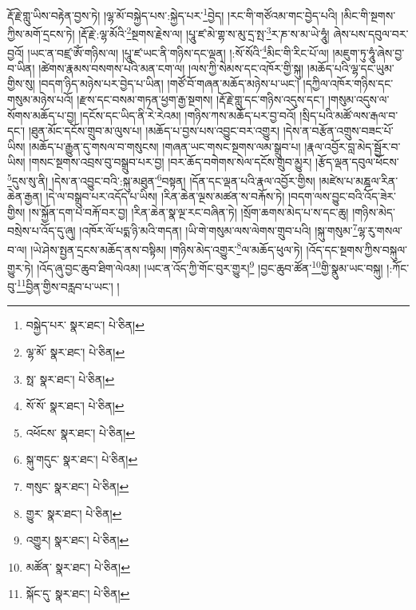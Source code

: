 རྡོ་རྗེ་གླུ་ཡིས་བརྟེན་བྱས་ཏེ། །ལྷ་མོ་བསྐྱེད་པས་:སྐྱེད་པར་\footnote{བསྐྱེད་པར་  སྣར་ཐང་།  པེ་ཅིན། }བྱེད། །རང་གི་གཙོའམ་གང་བྱེད་པའི། །མིང་གི་སྔགས་ཀྱིས་མགོ་དྲངས་ཏེ། །རྡོ་རྗེ་:ལྷ་མོའི་\footnote{ལྷ་མོ་  སྣར་ཐང་།  པེ་ཅིན། }སྔགས་རྗེས་ལ། །པཱུ་ཛ་མེ་གྷ་ས་མུ་དྲ་སྤ་\footnote{སྥ་  སྣར་ཐང་།  པེ་ཅིན། }ར་ཎ་ས་མ་ཡེ་ཧཱུཾ། ཞེས་པས་དབུལ་བར་བྱའོ། །ཡང་ན་བཛྲ་ཨོཾ་གཉིས་ལ། །པཱུ་ཛ་ཡང་ནི་གཉིས་དང་ལྡན། །:སོ་སོའི་\footnote{སོ་སོ་  སྣར་ཐང་།  པེ་ཅིན། }མིང་གི་རིང་པོ་ལ། །མཇུག་ཏུ་ཧཱུཾ་ཞེས་བྱ་བ་ཡིན། །ཚེགས་རྣམས་བསགས་པའི་མན་ངག་ལ། །ལས་ཀྱི་སེམས་དང་འཁོར་གྱི་སྐུ། །མཆོད་པའི་ལྷ་དང་ཡུམ་གྱིས་སུ། །བདག་ཉིད་མཉེས་པར་བྱེད་པ་ཡིན། །གཙོ་བོ་གཞན་མཆོད་མཉེས་པ་ཡང་། །དཀྱིལ་འཁོར་གཉིས་དང་གསུམ་མཉེས་པའོ། །རྫས་དང་བསམ་གཏན་ཕྱག་རྒྱ་སྔགས། །རྡོ་རྗེ་གླུ་དང་གཉིས་འདུས་དང་། །གསུམ་འདུས་ལ་སོགས་མཆོད་པ་བྱ། །དངོས་དང་ཡིད་ནི་རེ་རེའམ། །གཉིས་ཀས་མཆོད་པར་བྱ་བའོ། །སྲིད་པའི་མཚོ་ལས་རྒལ་བ་དང་། །ཐུན་མོང་དངོས་གྲུབ་མ་ལུས་པ། །མཆོད་པ་བྱས་པས་འབྱུང་བར་འགྱུར། །དེས་ན་བརྩོན་འགྲུས་བཟང་པོ་ཡིས། །མཆོད་པ་རྒྱུན་དུ་གསལ་བ་གསུངས། །གཞན་ཡང་གསང་སྔགས་ལམ་སྒྲུབ་པ། །རྣལ་འབྱོར་བླ་མེད་སྦྱོར་བ་ཡིས། །གསང་སྔགས་འབྲས་བུ་བསྒྲུབ་པར་བྱ། །བར་ཆོད་བགེགས་སེལ་དངོས་གྲུབ་མྱུར། །རྩོད་ལྡན་དབུལ་ཕོངས་\footnote{འཕོངས་  སྣར་ཐང་།  པེ་ཅིན། }དུས་སུ་ནི། །དེས་ན་འབྱུང་བའི་:སྐུ་མཐུན་\footnote{སྐུ་གདུང་  སྣར་ཐང་།  པེ་ཅིན། }བསྟན། །དོན་དང་ལྡན་པའི་རྣལ་འབྱོར་གྱིས། །མཛེས་པ་མཎྜལ་རིན་ཆེན་རྒྱན། །དེ་ལ་བསྒྲུབ་པར་འདོད་པ་ཡིས། །རིན་ཆེན་ལྔས་མཚན་ས་བརྐོས་ཏེ། །བདག་ལས་བྱུང་བའི་འོད་ཟེར་གྱིས། །ས་སྐྱོན་དག་པ་བརྐོ་བར་བྱ། །རིན་ཆེན་སྣ་ལྔ་རང་བཞིན་ཏེ། །སྲོག་ཆགས་མེད་པ་ས་དང་ཆུ། །གཉིས་མེད་བསྲེས་པ་འོད་དུ་ཞུ། །འཁོར་ལོ་པདྨ་ཉི་མའི་གདན། །ཡི་གེ་གསུམ་ལས་ལེགས་གྲུབ་པའི། །སྐུ་གསུམ་\footnote{གསུང་  སྣར་ཐང་།  པེ་ཅིན། }ལྷ་རུ་གསལ་བ་ལ། །ཡེ་ཤེས་སྤྱན་དྲངས་མཆོད་ནས་བསྟིམ། །གཉིས་མེད་འགྱུར་\footnote{གྱུར་  སྣར་ཐང་།  པེ་ཅིན། }ལ་མཆོད་ཕུལ་ཏེ། །འོད་དང་སྔགས་ཀྱིས་བསྐུལ་གྱུར་ཏེ། །འོད་ཞུ་བྱང་ཆུབ་ཐིག་ལེའམ། །ཡང་ན་འོད་ཀྱི་གོང་བུར་གྱུར།\footnote{འགྱུར།  སྣར་ཐང་།  པེ་ཅིན། } །བྱང་ཆུབ་ཚོན་\footnote{མཚོན་  སྣར་ཐང་།  པེ་ཅིན། }གྱི་སྣུམ་ཡང་བསྐུ། །:ཀོང་བུ་\footnote{སྐོང་དུ་  སྣར་ཐང་།  པེ་ཅིན། }བྱིན་གྱིས་བརླབ་པ་ཡང་། །
